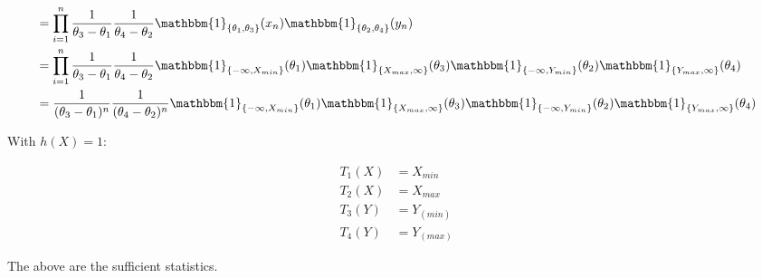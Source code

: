 \documentclass[11pt,letterpaper,titlepage]{article}
\begin{document}
\begin{enumerate}
    \begin{equation*}
        \begin{aligned}
            &= \prod_{i=1}^{n} \frac{1}{\theta_3 - \theta_1} \frac{1}{\theta_4 - \theta_2} \mathbbm{1}_{\{\theta_1, \theta_3\}}(x_n) \mathbbm{1}_{\{\theta_2, \theta_4\}}(y_n) \\
            &= \prod_{i=1}^{n} \frac{1}{\theta_3 - \theta_1} \frac{1}{\theta_4 - \theta_2} 
            \mathbbm{1}_{\{-\infty, X_{min}\}}(\theta_1)
            \mathbbm{1}_{\{X_{max}, \infty\}}(\theta_3)
            \mathbbm{1}_{\{-\infty, Y_{min}\}}(\theta_2)
            \mathbbm{1}_{\{Y_{max}, \infty\}}(\theta_4) \\
            &= \frac{1}{(\theta_3 - \theta_1)^n}
            \frac{1}{(\theta_4 - \theta_2)^n}
            \mathbbm{1}_{\{-\infty, X_{min}\}}(\theta_1)
            \mathbbm{1}_{\{X_{max}, \infty\}}(\theta_3)
            \mathbbm{1}_{\{-\infty, Y_{min}\}}(\theta_2)
            \mathbbm{1}_{\{Y_{max}, \infty\}}(\theta_4)
        \end{aligned}
    \end{equation*}
    
    With $h(X) = 1$:
    
    \begin{equation*}
        \begin{aligned}
            T_1(X) &= X_{min} \\
            T_2(X) &= X_{max} \\
            T_3(Y) &= Y_(min) \\
            T_4(Y) &= Y_(max)
        \end{aligned}
    \end{equation*}
    
    The above are the sufficient statistics.
    
\end{enumerate}
\end{document}
